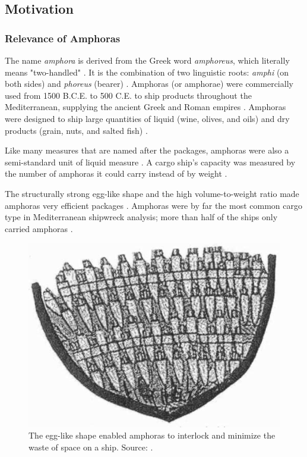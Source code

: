 \documentclass[a4paper, 11pt, oneside]{article}
\begin{document}

  \subsection{Motivation}

  \subsubsection{Relevance of Amphoras}

  The name \textit{amphora} is derived from the Greek word \textit{amphoreus}, which literally means "two-handled"
  \cite{harper2001online, twede2002commercial}. It is the combination of two linguistic roots: \textit{amphi}
  (on both sides) and \textit{phoreus} (bearer) \cite{harper2001online, twede2002commercial}. Amphoras (or amphorae)
  were commercially used from 1500 B.C.E. to 500 C.E. to ship products throughout the Mediterranean,
  supplying the ancient Greek and Roman empires \cite{twede2002commercial}. Amphoras were designed to ship large quantities
  of liquid (wine, olives, and oils) and dry products (grain, nuts, and salted fish) \cite{twede2002commercial}.

  Like many measures that are named after the packages, amphoras were also a semi-standard unit of liquid
  measure \cite{twede2002commercial}. A cargo ship's capacity was measured by the number of amphoras it could carry
  instead of by weight \cite{twede2002commercial, cousteau1954fish}.

  The structurally strong egg-like shape and the high volume-to-weight ratio made amphoras very efficient packages
  \cite{twede2002commercial}. Amphoras were by far the most common cargo type in Mediterranean shipwreck analysis;
  more than half of the ships only carried amphoras \cite{twede2002commercial, parker1984shipwrecks}.

  \begin{figure}[ht]
    \begin{center}
      \includegraphics[width=.6\textwidth]{amphora_stowage_aboard_ship.png}
    \end{center}
    \caption{The egg-like shape enabled amphoras to interlock and minimize the waste of space on a ship.
    Source: \cite{twede2002commercial}.}
  \end{figure}
\end{document}
